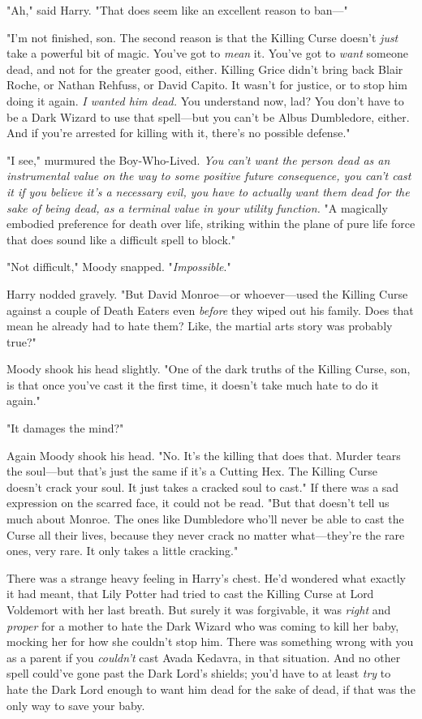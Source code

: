 "Ah," said Harry. "That does seem like an excellent reason to ban—"

"I'm not finished, son. The second reason is that the Killing Curse doesn't
\emph{just} take a powerful bit of magic. You've got to \emph{mean} it. You've
got to \emph{want} someone dead, and not for the greater good, either. Killing
Grice didn't bring back Blair Roche, or Nathan Rehfuss, or David Capito. It
wasn't for justice, or to stop him doing it again. \emph{I wanted him dead.}
You understand now, lad? You don't have to be a Dark Wizard to use that
spell—but you can't be Albus Dumbledore, either. And if you're arrested for
killing with it, there's no possible defense."

"I{\el} see," murmured the Boy-Who-Lived. \emph{You can't want the person
dead as an instrumental value on the way to some positive future consequence,
you can't cast it if you believe it's a necessary evil, you have to actually
want them dead for the sake of being dead, as a terminal value in your utility
function.} "A magically embodied preference for death over life, striking
within the plane of pure life force{\el} that does sound like a difficult
spell to block."

"Not difficult," Moody snapped. "\emph{Impossible}."

Harry nodded gravely. "But David Monroe—or whoever—used the Killing Curse
against a couple of Death Eaters even \emph{before} they wiped out his family.
Does that mean he already had to hate them? Like, the martial arts story was
probably true?"

Moody shook his head slightly. "One of the dark truths of the Killing Curse,
son, is that once you've cast it the first time, it doesn't take much hate to
do it again."

"It damages the mind?"

Again Moody shook his head. "No. It's the killing that does that. Murder tears
the soul—but that's just the same if it's a Cutting Hex. The Killing Curse
doesn't crack your soul. It just takes a cracked soul to cast." If there was a
sad expression on the scarred face, it could not be read. "But that doesn't
tell us much about Monroe. The ones like Dumbledore who'll never be able to
cast the Curse all their lives, because they never crack no matter
what—they're the rare ones, very rare. It only takes a little cracking."

There was a strange heavy feeling in Harry's chest. He'd wondered what exactly
it had meant, that Lily Potter had tried to cast the Killing Curse at Lord
Voldemort with her last breath. But surely it was forgivable, it was
\emph{right} and \emph{proper} for a mother to hate the Dark Wizard who was
coming to kill her baby, mocking her for how she couldn't stop him. There was
something wrong with you as a parent if you \emph{couldn't} cast Avada Kedavra,
in that situation. And no other spell could've gone past the Dark Lord's
shields; you'd have to at least \emph{try} to hate the Dark Lord enough to want
him dead for the sake of dead, if that was the only way to save your baby.

